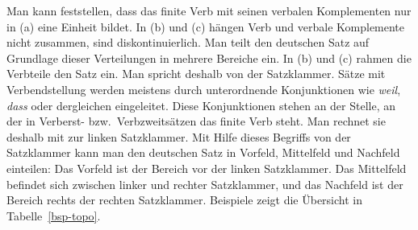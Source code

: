 Man kann feststellen, dass das finite Verb mit seinen verbalen 
Komplementen nur in (a) eine Einheit bildet.
In (b) und (c) hängen Verb und verbale Komplemente 
nicht zusammen, sind diskontinuierlich.
Man teilt den deutschen Satz auf Grundlage dieser Verteilungen 
in mehrere Bereiche ein. In (b) und (c) rahmen 
die Verbteile den Satz ein. Man spricht deshalb von der Satzklammer.
Sätze mit Verbendstellung werden meistens durch unterordnende Konjunktionen
wie \emph{weil}, \emph{dass} oder dergleichen
eingeleitet. Diese Konjunktionen stehen an der Stelle, an der
in Verberst- bzw.\ Verbzweitsätzen das finite Verb steht. Man rechnet sie
deshalb mit zur linken Satzklammer.
Mit Hilfe dieses Begriffs von der Satzklammer kann man den deutschen Satz 
in Vorfeld, Mittelfeld und Nachfeld einteilen: Das Vorfeld ist der Bereich
vor der linken Satzklammer. Das Mittelfeld befindet sich zwischen linker und rechter
Satzklammer, und das Nachfeld ist der Bereich rechts der rechten Satzklammer.
Beispiele zeigt die Übersicht in Tabelle~\vref{bsp-topo}.
{}
